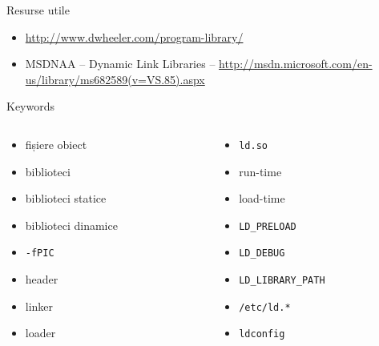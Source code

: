 \documentclass{beamer}
\begin{document}
\begin{frame}{Resurse utile}
  \begin{itemize}
    \item \url{http://www.dwheeler.com/program-library/}
    \item MSDNAA -- Dynamic Link Libraries --
    \url{http://msdn.microsoft.com/en-us/library/ms682589(v=VS.85).aspx}
  \end{itemize}
\end{frame}

\begin{frame}{Keywords}
  \begin{columns}
    \begin{column}[l]{0.5\textwidth}
      \begin{itemize}
        \item fișiere obiect
        \item biblioteci
        \item biblioteci statice
        \item biblioteci dinamice
        \item \texttt{-fPIC}
        \item header
        \item linker
        \item loader
      \end{itemize}
    \end{column}
    \begin{column}[l]{0.5\textwidth}
      \begin{itemize}
        \item \texttt{ld.so}
        \item run-time
        \item load-time
        \item \texttt{LD\_PRELOAD}
        \item \texttt{LD\_DEBUG}
        \item \texttt{LD\_LIBRARY\_PATH}
        \item \texttt{/etc/ld.*}
        \item \texttt{ldconfig}
      \end{itemize}
    \end{column}
  \end{columns}
\end{frame}
\end{document}
